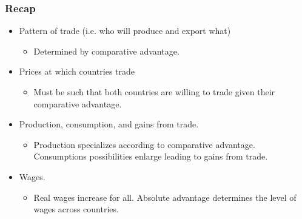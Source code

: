 \documentclass[handout]{beamer}
\begin{document}
\begin{frame}[t]
\frametitle{Recap}
\begin{itemize}
\item Pattern of trade (i.e. who will produce and export what)
\begin{itemize}
\medskip
\item Determined by comparative advantage.
\end{itemize}
\medskip
\item Prices at which countries trade
\begin{itemize}
\medskip
\item Must be such that both countries are willing to trade given their comparative advantage.
\end{itemize}
\medskip
\item Production, consumption, and gains from trade.
\begin{itemize}
\medskip
\item Production specializes according to comparative advantage. Consumptions possibilities enlarge leading to gains from trade.
\end{itemize}
\medskip
\item Wages.
\begin{itemize}
\medskip
\item Real wages increase for all. Absolute advantage determines the level of wages across countries.
\end{itemize}
\end{itemize}
\end{frame}
\end{document}

